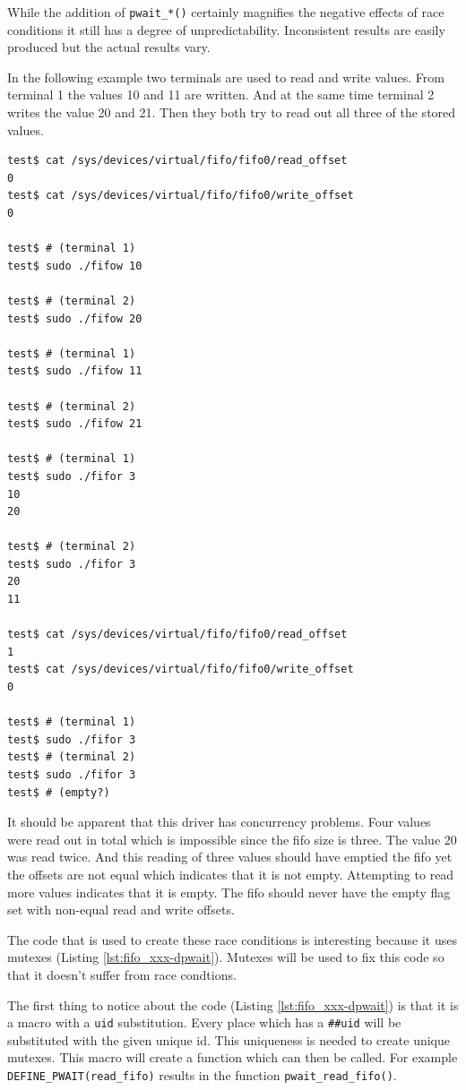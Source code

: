 \documentclass{article}
\begin{document}
\begin{samepage}
While the addition of \verb+pwait_*()+ certainly magnifies the negative
effects of race conditions it still has a degree of unpredictability.
Inconsistent results are easily produced but the actual results vary.

In the following example two terminals are used to read and write values.
From terminal 1 the values 10 and 11 are written.
And at the same time terminal 2 writes the value 20 and 21.
Then they both try to read out all three of the stored values.

\begin{verbatim}
test$ cat /sys/devices/virtual/fifo/fifo0/read_offset
0
test$ cat /sys/devices/virtual/fifo/fifo0/write_offset
0

test$ # (terminal 1)
test$ sudo ./fifow 10

test$ # (terminal 2)
test$ sudo ./fifow 20

test$ # (terminal 1)
test$ sudo ./fifow 11

test$ # (terminal 2)
test$ sudo ./fifow 21

test$ # (terminal 1)
test$ sudo ./fifor 3
10
20

test$ # (terminal 2)
test$ sudo ./fifor 3
20
11

test$ cat /sys/devices/virtual/fifo/fifo0/read_offset
1
test$ cat /sys/devices/virtual/fifo/fifo0/write_offset
0

test$ # (terminal 1)
test$ sudo ./fifor 3
test$ # (terminal 2)
test$ sudo ./fifor 3
test$ # (empty?)

\end{verbatim}

It should be apparent that this driver has concurrency problems.
Four values were read out in total which is impossible since
the fifo size is three.
The value 20 was read twice.
And this reading of three values should have emptied the fifo
yet the offsets are not equal which indicates that it is not empty.
Attempting to read more values indicates that it is empty.
The fifo should never have the empty flag set with non-equal
read and write offsets.
\end{samepage}

The code that is used to create these race conditions is interesting
because it uses mutexes (Listing \ref{lst:fifo_xxx-dpwait}).
Mutexes will be used to fix this code so that it doesn't suffer
from race condtions.

The first thing to notice about the code (Listing \ref{lst:fifo_xxx-dpwait})
is that it is a macro with a \verb+uid+ substitution.
Every place which has a \verb+##uid+ will be substituted with the
given unique id.
This uniqueness is needed to create unique mutexes.
This macro will create a function which can then be called.
For example \verb+DEFINE_PWAIT(read_fifo)+ results in the function
\verb+pwait_read_fifo()+.
\end{document}
